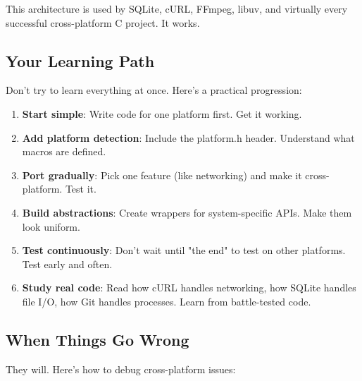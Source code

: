 This architecture is used by SQLite, cURL, FFmpeg, libuv, and virtually every successful cross-platform C project. It works.

\subsection{Your Learning Path}

Don't try to learn everything at once. Here's a practical progression:

\begin{enumerate}
    \item \textbf{Start simple}: Write code for one platform first. Get it working.

    \item \textbf{Add platform detection}: Include the platform.h header. Understand what macros are defined.

    \item \textbf{Port gradually}: Pick one feature (like networking) and make it cross-platform. Test it.

    \item \textbf{Build abstractions}: Create wrappers for system-specific APIs. Make them look uniform.

    \item \textbf{Test continuously}: Don't wait until "the end" to test on other platforms. Test early and often.

    \item \textbf{Study real code}: Read how cURL handles networking, how SQLite handles file I/O, how Git handles processes. Learn from battle-tested code.
\end{enumerate}

\subsection{When Things Go Wrong}

They will. Here's how to debug cross-platform issues:

